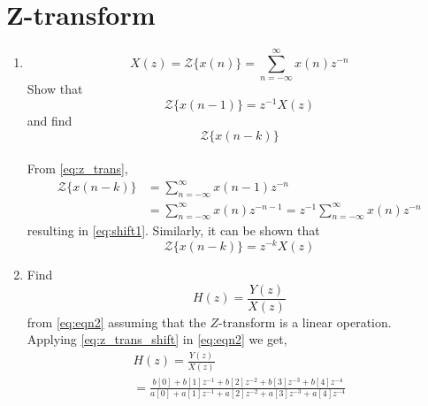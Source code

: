 \documentclass[journal,12pt,twocolumn]{IEEEtran}
\renewcommand\thesection{\arabic{section}}
\begin{document}
\section{Z-transform}

\begin{enumerate}[label=\thesection.\arabic*,ref=\thesection.\theenumi]

\item
\label{prob:Z_transf}
\begin{equation}
\label{eq:z_trans}
X(z)={\mathcal {Z}}\{x(n)\}=\sum _{n=-\infty }^{\infty }x(n)z^{-n}
\end{equation}
Show that
\begin{equation}
\label{eq:shift1}
{\mathcal {Z}}\{x(n-1)\} = z^{-1}X(z)
\end{equation}
and find
\begin{equation}
	{\mathcal {Z}}\{x(n-k)\} 
\end{equation}
\\
\solution From \eqref{eq:z_trans},
\begin{align}
{\mathcal {Z}}\{x(n-k)\} &=\sum _{n=-\infty }^{\infty }x(n-1)z^{-n}
\\
&=\sum _{n=-\infty }^{\infty }x(n)z^{-n-1} = z^{-1}\sum _{n=-\infty }^{\infty }x(n)z^{-n}
\end{align}
resulting in \eqref{eq:shift1}. Similarly, it can be shown that
\begin{equation}
\label{eq:z_trans_shift}
	{\mathcal {Z}}\{x(n-k)\} = z^{-k}X(z)
\end{equation}

\item Find
\begin{equation}
H(z) = \frac{Y(z)}{X(z)}
\end{equation}
from  \eqref{eq:eqn2} assuming that the $Z$-transform is a linear operation.
\\
\solution  Applying \eqref{eq:z_trans_shift} in \eqref{eq:eqn2} we get,
\begin{equation}
\begin{split}
H(z) = \frac{Y(z)}{X(z)}                
\\
=\frac{b[0]+b[1]z^{-1}+b[2]z^{-2}+b[3]z^{-3}+b[4]z^{-4}}{a[0]+a[1]z^{-1}+a[2]z^{-2}+a[3]z^{-3}+a[4]z^{-4}}
\label{eq:freq_resp}
\end{split}
\end{equation}


\end{enumerate}
\end{document}
